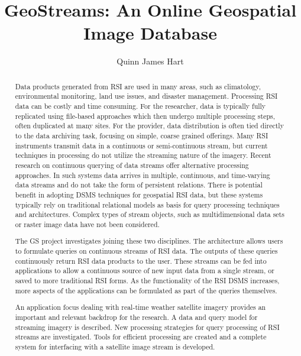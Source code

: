 \documentclass{ucdthesis}       %
\begin{document}
 
\title           {GeoStreams: An Online Geospatial Image Database}
\author          {Quinn James Hart}

\begin{abstract}

  Data products generated from \acf{RSI} are used in many areas, such
  as climatology, environmental monitoring, land use issues, and
  disaster management.  Processing \ac{RSI} data can be costly and
  time consuming.  For the researcher, data is typically fully
  replicated using file-based approaches which then undergo multiple
  processing steps, often duplicated at many sites.  For the provider,
  data distribution is often tied directly to the data archiving task,
  focusing on simple, coarse grained offerings.  Many \ac{RSI}
  instruments transmit data in a continuous or semi-continuous stream,
  but current techniques in processing do not utilize the streaming
  nature of the imagery.  Recent research on continuous querying of
  data streams offer alternative processing approaches.  In such
  systems data arrives in multiple, continuous, and time-varying data
  streams and do not take the form of persistent relations.  There is
  potential benefit in adopting \acf{DSMS} techniques for geospatial
  \ac{RSI} data, but these systems typically rely on traditional
  relational models as basis for query processing techniques and
  architectures.  Complex types of stream objects, such as
  multidimensional data sets or raster image data have not been
  considered.

  The \ac{GS} project investigates joining these two disciplines.  The
  architecture allows users to formulate queries on continuous streams
  of \ac{RSI} data.  The outputs of these queries continuously return
  \ac{RSI} data products to the user.  These streams can be fed into
  applications to allow a continuous source of new input data from a
  single stream, or saved to more traditional \ac{RSI} forms.  As the
  functionality of the \ac{RSI} \ac{DSMS} increases, more aspects of
  the applications can be formulated as part of the queries
  themselves.

  An application focus dealing with real-time weather satellite
  imagery provides an important and relevant backdrop for the
  research.  A data and query model for streaming imagery is
  described.  New processing strategies for query processing of
  \ac{RSI} streams are investigated.  Tools for efficient processing
  are created and a complete system for interfacing with a satellite
  image stream is developed.

\end{abstract}
\end{document}

